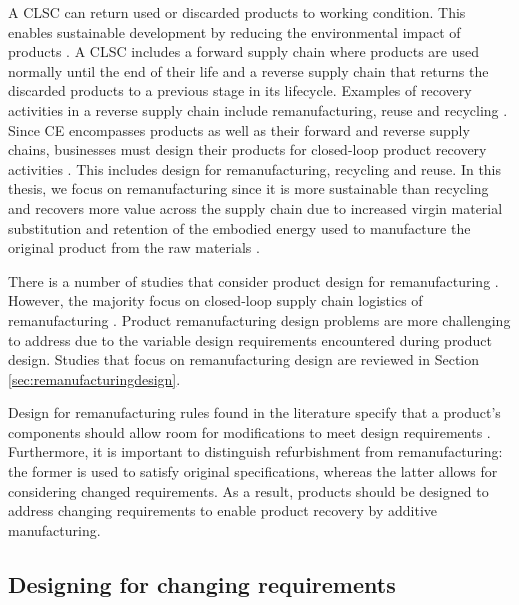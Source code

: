 A \ac{CLSC} can return used or discarded products to working condition. This enables sustainable development by reducing the environmental impact of products \cite{QuariguasiFrotaNeto2010}. A \ac{CLSC} includes a forward supply chain where products are used normally until the end of their life and a reverse supply chain that returns the discarded products to a previous stage in its lifecycle. Examples of recovery activities in a reverse supply chain include remanufacturing, reuse and recycling \cite{Lieder2016,MacArthur2012}. Since \ac{CE} encompasses products as well as their forward and reverse supply chains, businesses must design their products for closed-loop product recovery activities \cite{Lieder2016}. This includes design for remanufacturing, recycling and reuse. In this thesis, we focus on remanufacturing since it is more sustainable than recycling and recovers more value across the supply chain due to increased virgin material substitution and retention of the embodied energy used to manufacture the original product from the raw materials \cite{MacArthur2012,Goodall2014}. 

There is a number of studies that consider product design for remanufacturing \cite{Ijomah2010,Liu2017}. However, the majority focus on closed-loop supply chain logistics of remanufacturing \cite{Mahadevan,Golinska2015,VanThao2015,Song2005,Koren2018}. Product remanufacturing design problems are more challenging to address due to the variable design requirements encountered during product design. Studies that focus on remanufacturing design are reviewed in Section \ref{sec:remanufacturingdesign}. 

Design for remanufacturing rules found in the literature specify that a product's components should allow room for modifications to meet design requirements \cite{Ijomah2009}. Furthermore, it is important to distinguish refurbishment from remanufacturing: the former is used to satisfy original specifications, whereas the latter allows for considering changed requirements. As a result, products should be designed to address changing requirements to enable product recovery by additive manufacturing.

\subsection{Designing for changing requirements} \label{subsec:changingreq}

